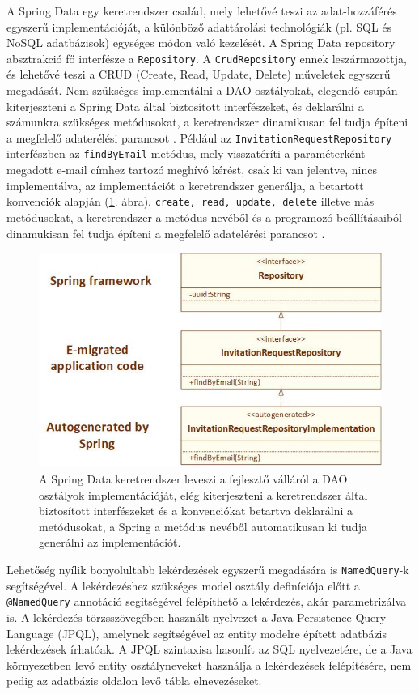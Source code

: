 A Spring Data egy keretrendszer család, mely lehetővé teszi az adat-hozzáférés egyszerű implementációját, a különböző adattárolási technológiák (pl. SQL és NoSQL adatbázisok) egységes módon való kezelését. 
A Spring Data repository absztrakció fő interfésze a \texttt{Repository}. A \texttt{CrudRepository} ennek leszármazottja, és lehetővé teszi a CRUD (Create, Read, Update, Delete) műveletek egyszerű megadását. Nem szükséges implementálni a DAO osztályokat, elegendő csupán kiterjeszteni a Spring Data által biztosított interfészeket, és deklarálni a  számunkra szükséges metódusokat, a keretrendszer dinamikusan fel tudja építeni a megfelelő adaterélési parancsot \cite{DataJPA}. Például az  \texttt{InvitationRequestRepository} interfészben az \texttt{findByEmail} metódus, mely visszatéríti a paraméterként megadott e-mail címhez tartozó meghívó kérést, csak ki van jelentve, nincs implementálva, az implementációt a keretrendszer generálja, a betartott konvenciók alapján (\ref{fig:SpringData}. ábra). \texttt{create, read, update, delete} illetve más metódusokat, a keretrendszer a metódus nevéből és a programozó beállításaiból dinamukisan fel tudja építeni a megfelelő adatelérési parancsot \cite{DataJPA}.  
\begin{figure}
  \centering
  \includegraphics[width=0.7\linewidth]{images/SpringData}
  \caption{A Spring Data keretrendszer leveszi a fejlesztő válláról a DAO osztályok implementációját, elég kiterjeszteni a keretrendszer által biztosított interfészeket és a konvenciókat betartva deklarálni a metódusokat, a Spring a metódus nevéből automatikusan ki tudja generálni az implementációt.}
  \label{fig:SpringData}
\end{figure}

Lehetőség nyílik bonyolultabb lekérdezések egyszerű megadására is \texttt{NamedQuery}-k segítségével. A lekérdezéshez szükséges model osztály definíciója előtt a \texttt{@NamedQuery} annotáció segítségével felépíthető a lekérdezés, akár parametrizálva is. A lekérdezés törzsszövegében használt nyelvezet a  Java Persistence Query Language (JPQL), amelynek segítségével az entity modelre épített adatbázis lekérdezések írhatóak. A JPQL szintaxisa hasonlít az SQL nyelvezetére, de a Java környezetben levő entity osztályneveket használja a lekérdezések felépítésére, nem pedig az adatbázis oldalon levő tábla elnevezéseket.

